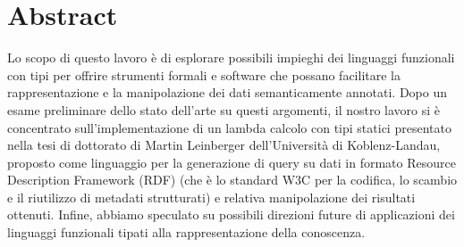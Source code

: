 \chapter*{Abstract}

Lo scopo di questo lavoro è di esplorare possibili impieghi dei linguaggi funzionali con tipi per offrire strumenti formali e software che possano facilitare la rappresentazione e la manipolazione dei dati semanticamente annotati. Dopo un esame preliminare dello stato dell’arte su questi argomenti, il nostro lavoro si è concentrato sull’implementazione di un lambda calcolo con tipi statici presentato nella tesi di dottorato di Martin Leinberger dell’Università di Koblenz-Landau, proposto come linguaggio per la generazione di query su dati in formato Resource Description Framework (RDF) (che è lo standard W3C per la codifica, lo scambio e il riutilizzo di metadati strutturati) e relativa manipolazione dei risultati ottenuti. Infine, abbiamo speculato su possibili direzioni future di applicazioni dei linguaggi funzionali tipati alla rappresentazione della conoscenza.